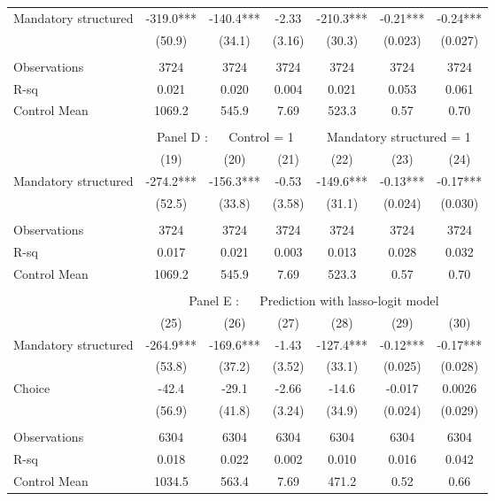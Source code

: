 \begin{tabular}{lcccccc}
\midrule
\midrule
Mandatory structured & -319.0*** & -140.4*** & -2.33 & -210.3*** & -0.21*** & -0.24*** \\
      & (50.9) & (34.1) & (3.16) & (30.3) & (0.023) & (0.027) \\
      &       &       &       &       &       &  \\
\midrule
Observations & 3724  & 3724  & 3724  & 3724  & 3724  & 3724 \\
R-sq  & 0.021 & 0.020 & 0.004 & 0.021 & 0.053 & 0.061 \\
Control Mean & 1069.2 & 545.9 & 7.69  & 523.3 & 0.57  & 0.70 \\
\midrule
\midrule
      &       &       &       &       &       &  \\
\midrule
      & \multicolumn{6}{c}{Panel D : $\quad$ Control  = 1       $\quad\quad$                      Mandatory structured = 1} \\
\midrule
\midrule
      & (19)  & (20)  & (21)  & (22)  & (23)  & (24) \\
\midrule
\midrule
Mandatory structured & -274.2*** & -156.3*** & -0.53 & -149.6*** & -0.13*** & -0.17*** \\
      & (52.5) & (33.8) & (3.58) & (31.1) & (0.024) & (0.030) \\
      &       &       &       &       &       &  \\
\midrule
Observations & 3724  & 3724  & 3724  & 3724  & 3724  & 3724 \\
R-sq  & 0.017 & 0.021 & 0.003 & 0.013 & 0.028 & 0.032 \\
Control Mean & 1069.2 & 545.9 & 7.69  & 523.3 & 0.57  & 0.70 \\
\midrule
\midrule
      &       &       &       &       &       &  \\
\midrule
      & \multicolumn{6}{c}{Panel E : $\quad$ Prediction with lasso-logit model} \\
\midrule
\midrule
      & (25)  & (26)  & (27)  & (28)  & (29)  & (30) \\
\midrule
\midrule
Mandatory structured & -264.9*** & -169.6*** & -1.43 & -127.4*** & -0.12*** & -0.17*** \\
      & (53.8) & (37.2) & (3.52) & (33.1) & (0.025) & (0.028) \\
Choice  & -42.4 & -29.1 & -2.66 & -14.6 & -0.017 & 0.0026 \\
      & (56.9) & (41.8) & (3.24) & (34.9) & (0.024) & (0.029) \\
      &       &       &       &       &       &  \\
\midrule
Observations & 6304  & 6304  & 6304  & 6304  & 6304  & 6304 \\
R-sq  & 0.018 & 0.022 & 0.002 & 0.010 & 0.016 & 0.042 \\
Control Mean & 1034.5 & 563.4 & 7.69  & 471.2 & 0.52  & 0.66 \\
\bottomrule
\bottomrule
\end{tabular}%
